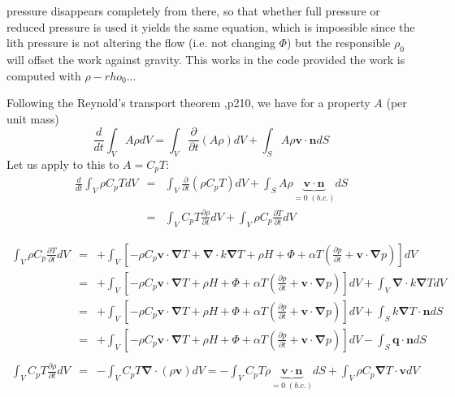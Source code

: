 {\color{red} pressure disappears completely from there, so that whether full pressure or reduced
pressure is used it yields the same equation, which is impossible since the lith pressure is not 
altering the flow (i.e. not changing $\Phi$) but the responsible $\rho_0$ will offset the 
work against gravity.} This works in the code provided the work is computed with $\rho-rho_0$...

\newpage
Following the Reynold's transport theorem \cite{malvern},p210, we have for a property $A$ (per unit mass)
\[
\frac{d}{dt} \int_V A \rho dV = \int_V \frac{\partial }{\partial t} (A\rho) dV + \int_S A \rho {\bm v}\cdot {\bm n} dS
\]
Let us apply to this to $A=C_p T$:
\begin{eqnarray}
\frac{d}{dt} \int_V \rho C_p T dV 
&=& \int_V \frac{\partial }{\partial t} (\rho C_p T ) dV + \int_S A \rho \underbrace{{\bm v}\cdot {\bm n}}_{=0 \; (b.c.)} dS \\
&=& \int_V C_p T \frac{\partial \rho}{\partial t} dV + \int_V \rho C_p \frac{\partial T}{\partial t}  dV 
\end{eqnarray}


\begin{eqnarray}
\int_V \rho C_p \frac{\partial T}{\partial t}  dV
&=&  
+ \int_V \left[ -\rho C_p {\bm v}\cdot {\bm \nabla}T +{\bm \nabla}\cdot k {\bm \nabla} T + \rho H  + \Phi    +\alpha T \left( \frac{\partial p}{\partial t}+  \bm v \cdot {\bm \nabla} p \right) \right]  dV \\ 
&=& 
+ \int_V \left[ -\rho C_p {\bm v}\cdot {\bm \nabla}T 
+ \rho H  + \Phi    +\alpha T \left( \frac{\partial p}{\partial t}+  \bm v \cdot {\bm \nabla} p \right) \right]  dV 
+ \int_V {\bm \nabla}\cdot k {\bm \nabla} T dV \\ 
&=& 
+ \int_V \left[ -\rho C_p {\bm v}\cdot {\bm \nabla}T 
+ \rho H  + \Phi    +\alpha T \left( \frac{\partial p}{\partial t}+  \bm v \cdot {\bm \nabla} p \right) \right]  dV 
+ \int_S  k {\bm \nabla} T \cdot {\bm n}  dS \\ 
&=& 
+ \int_V \left[ -\rho C_p {\bm v}\cdot {\bm \nabla}T 
+ \rho H  + \Phi    +\alpha T \left( \frac{\partial p}{\partial t}+  \bm v \cdot {\bm \nabla} p \right) \right]  dV 
- \int_S  {\bm q} \cdot {\bm n}  dS 
\\
\\
 \int_V C_p T \frac{\partial \rho}{\partial t} dV
&=& 
- \int_V C_p T {\bm \nabla} \cdot (\rho {\bm v}) dV
=
-\int_V C_p T \rho \underbrace{{\bm v} \cdot {\bm n}}_{=0 \; (b.c.)} dS +  \int_V \rho C_p  {\bm \nabla}  T \cdot {\bm v} dV
\end{eqnarray}

